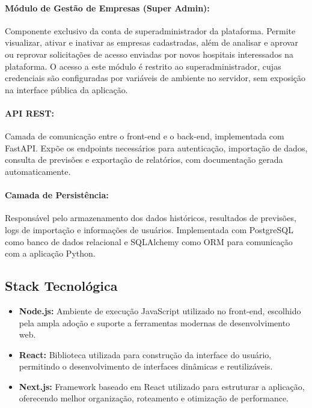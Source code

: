 \documentclass[12pt,a4paper]{article}
\begin{document}
\paragraph{Módulo de Gestão de Empresas (Super Admin):}
Componente exclusivo da conta de superadministrador da plataforma. Permite visualizar, ativar e inativar as empresas cadastradas, além de analisar e aprovar ou reprovar solicitações de acesso enviadas por novos hospitais interessados na plataforma. O acesso a este módulo é restrito ao superadministrador, cujas credenciais são configuradas por variáveis de ambiente no servidor, sem exposição na interface pública da aplicação.

\paragraph{API REST:}
Camada de comunicação entre o front-end e o back-end, implementada com 
FastAPI. Expõe os endpoints necessários para autenticação, importação de 
dados, consulta de previsões e exportação de relatórios, com documentação 
gerada automaticamente.

\paragraph{Camada de Persistência:}
Responsável pelo armazenamento dos dados históricos, resultados de 
previsões, logs de importação e informações de usuários. Implementada com 
PostgreSQL como banco de dados relacional e SQLAlchemy como ORM para 
comunicação com a aplicação Python.

\subsection{Stack Tecnológica}

\begin{itemize}
    \item \textbf{Node.js:} Ambiente de execução JavaScript utilizado no front-end, escolhido pela ampla adoção e suporte a ferramentas modernas de desenvolvimento web.
    \item \textbf{React:} Biblioteca utilizada para construção da interface do usuário, permitindo o desenvolvimento de interfaces dinâmicas e reutilizáveis.
    \item \textbf{Next.js:} Framework baseado em React utilizado para estruturar a aplicação, oferecendo melhor organização, roteamento e otimização de performance.
\end{itemize}
\end{document}

